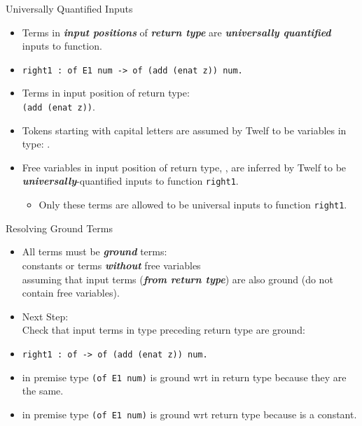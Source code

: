 \documentclass{beamer}
\renewcommand{\emph}[1]{\textbf{\textit{#1}}}
\begin{document}
\begin{frame}{Universally Quantified Inputs}
\begin{itemize}
\item Terms in \emph{input positions} of
\emph{return type} are \emph{universally quantified}
inputs to function.

\item
\texttt{right1 : of E1 num -> of (add  (enat z)) num.}

\pause
\item Terms in input position of return type: \\
\texttt{(add  (enat z))}.

\pause
\item Tokens starting with capital letters are assumed
by Twelf to be variables in type: \texttt{}.

\pause
\item Free variables in input position of return type,
\texttt{},
are inferred by Twelf to be
\emph{universally}-quantified inputs to function
\texttt{right1}.
  \begin{itemize}
  \item Only these terms are allowed to be universal
  inputs to function \texttt{right1}.
  \end{itemize}
\end{itemize}
\end{frame}



\begin{frame}{Resolving Ground Terms}
\begin{itemize}
\item All terms must be \emph{ground} terms: \\
constants or terms \emph{without} free variables \\
assuming that input terms (\emph{from return type})
are also ground (do not contain free variables).


\item Next Step: \\
Check that input terms in type preceding return type are
ground:

\item
\texttt{right1 : of
                   ->
                 of (add
                      (enat z))
                    num.}

\item<3->
\texttt{} in premise type \texttt{(of E1 num)} is
ground wrt \texttt{} in return type
because they are the same.

\item<4->
\texttt{} in premise type \texttt{(of E1 num)} is
ground wrt return type
because \texttt{} is a constant.
\end{itemize}
\end{frame}
\end{document}
